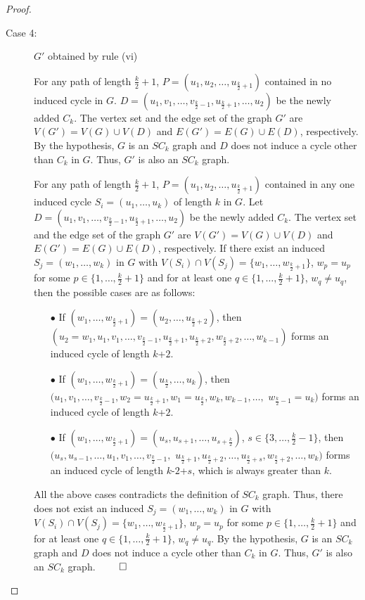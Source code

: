 \documentclass[runningheads]{llncs}
\begin{document}
\begin{proof}
\begin{description}
\begin{description}
\item[Case 4:] $G'$ obtained by rule (vi)


For any path of length $\frac{k}{2}+1$, $P=(u_1,u_2,\ldots,u_{\frac{k}{2}+1})$ contained in no induced cycle in $G$. $D=(u_1,v_1,\ldots,v_{\frac{k}{2}-1}, u_{\frac{k}{2}+1},\ldots, u_2)$ be the newly added $C_k$. The vertex set and the edge set of the graph $G'$ are $V(G')=V(G)\cup V(D)$ and $E(G')=E(G)\cup E(D)$, respectively. By the hypothesis, $G$ is an $SC_k$ graph and $D$ does not induce a cycle other than $C_k$ in $G$. Thus, $G'$ is also an $SC_k$ graph. 



For any path of length $\frac{k}{2}+1$, $P=(u_1,u_2,\ldots,u_{\frac{k}{2}+1})$ contained in any one induced cycle $S_i=(u_1,\ldots, u_k)$ of length $k$ in $G$. Let $D=(u_1,v_1,\ldots,v_{\frac{k}{2}-1}, u_{\frac{k}{2}+1},\ldots, u_2)$ be the newly added $C_k$. The vertex set and the edge set of the graph $G'$ are $V(G')=V(G)\cup V(D)$ and $E(G')=E(G)\cup E(D)$, respectively. If there exist an induced $S_j=(w_1,\ldots,w_k)$ in $G$ with $V(S_i) \cap V(S_j) = \{w_1,\ldots,w_{\frac{k}{2}+1}\}$, $w_p = u_p$ for some $p \in\{1,\ldots, \frac{k}{2}+1\}$ and for at least one $q \in\{1,\ldots, \frac{k}{2}+1\}$, $w_q \neq u_q$, then the possible cases are as follows:

\begin{itemize}
\item[$\bullet$] If $(w_1,\ldots,w_{\frac{k}{2}+1}) = (u_2,\ldots,u_{\frac{k}{2}+2})$, then $(u_2 = w_1,u_1,v_1, \ldots, v_{\frac{k}{2}-1}, u_{\frac{k}{2}+1}, u_{\frac{k}{2}+2}, w_{\frac{k}{2}+2}, \ldots, w_{k-1})$ forms an induced cycle of length $k$+$2$.

\item[$\bullet$] If $(w_1,\ldots,w_{\frac{k}{2}+1}) = (u_{\frac{k}{2}},\ldots, u_{k})$, then $(u_1,v_1, \ldots, v_{\frac{k}{2}-1}, w_2=u_{\frac{k}{2}+1}, w_1=u_{\frac{k}{2}}, w_k, w_{k-1}, \ldots,$ $w_{\frac{k}{2}-1}=u_k)$ forms an induced cycle of length $k$+$2$.

\item[$\bullet$] If $(w_1,\ldots,w_{\frac{k}{2}+1}) = (u_s, u_{s+1}, \ldots, u_{s+\frac{k}{2}})$, $s \in \{3,\ldots, \frac{k}{2}-1\}$, then $(u_s, u_{s-1}, \ldots, u_1, v_1, \ldots, v_{\frac{k}{2}-1},$ $u_{\frac{k}{2}+1}, u_{\frac{k}{2}+2}, \ldots, u_{\frac{k}{2}+s}, w_{\frac{k}{2}+2}, \ldots, w_k)$ forms an induced cycle of length $k$-$2$+$s$, which is always greater than $k$.
\end{itemize}


All the above cases contradicts the definition of $SC_k$ graph. Thus, there does not exist an induced $S_j=(w_1,\ldots,w_k)$ in $G$ with $V(S_i) \cap V(S_j) = \{w_1,\ldots,w_{\frac{k}{2}+1}\}$, $w_p = u_p$ for some $p \in\{1,\ldots, \frac{k}{2}+1\}$ and for at least one $q \in\{1,\ldots, \frac{k}{2}+1\}$, $w_q \neq u_q$. By the hypothesis, $G$ is an $SC_k$ graph and $D$ does not induce a cycle other than $C_k$ in $G$. Thus, $G'$ is also an $SC_k$ graph.  $\hfill \qed$
\end{description}
\end{description}
\end{proof}
\end{document}
